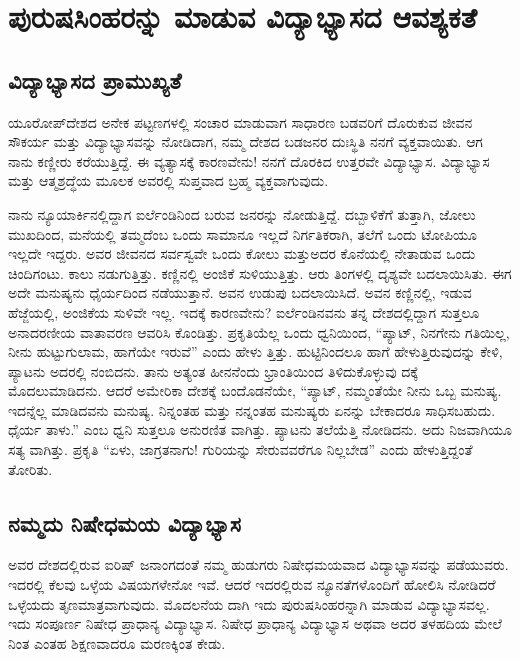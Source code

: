 
\chapter{ಪುರುಷಸಿಂಹರನ್ನು ಮಾಡುವ ವಿದ್ಯಾಭ್ಯಾಸದ ಆವಶ್ಯಕತೆ}

\section{ವಿದ್ಯಾಭ್ಯಾಸದ ಪ್ರಾಮುಖ್ಯತೆ}

ಯೂರೋಪ್​ದೇಶದ ಅನೇಕ ಪಟ್ಟಣಗಳಲ್ಲಿ ಸಂಚಾರ ಮಾಡುವಾಗ ಸಾಧಾರಣ ಬಡವರಿಗೆ ದೊರುಕುವ ಜೀವನ ಸೌಕರ್ಯ ಮತ್ತು ವಿದ್ಯಾಭ್ಯಾಸವನ್ನು ನೋಡಿದಾಗ, ನಮ್ಮ ದೇಶದ ಬಡಜನರ ದುಃಸ್ಥಿತಿ ನನಗೆ ವ್ಯಕ್ತವಾಯಿತು. ಆಗ ನಾನು ಕಣ್ಣೀರು ಕರೆಯುತ್ತಿದ್ದೆ. ಈ ವ್ಯತ್ಯಾಸಕ್ಕೆ ಕಾರಣವೇನು! ನನಗೆ ದೊರಕಿದ ಉತ್ತರವೇ ವಿದ್ಯಾಭ್ಯಾಸ. ವಿದ್ಯಾಭ್ಯಾಸ ಮತ್ತು ಆತ್ಮಶ್ರದ್ಧೆಯ ಮೂಲಕ ಅವರಲ್ಲಿ ಸುಪ್ತವಾದ ಬ್ರಹ್ಮ ವ್ಯಕ್ತವಾಗುವುದು.

ನಾನು ನ್ಯೂಯಾರ್ಕಿನಲ್ಲಿದ್ದಾಗ ಐರ್ಲೆಂಡಿನಿಂದ ಬರುವ ಜನರನ್ನು ನೋಡುತ್ತಿದ್ದೆ. ದಬ್ಬಾಳಿಕೆಗೆ ತುತ್ತಾಗಿ, ಜೋಲು ಮುಖದಿಂದ, ಮನೆಯಲ್ಲಿ ತಮ್ಮದೆಂಬ ಒಂದು ಸಾಮಾನೂ ಇಲ್ಲದೆ ನಿರ್ಗತಿಕರಾಗಿ, ತಲೆಗೆ ಒಂದು ಟೋಪಿಯೂ ಇಲ್ಲದೇ ಇದ್ದರು. ಅವರ ಜೀವನದ ಸರ್ವಸ್ವವೇ ಒಂದು ಕೋಲು ಮತ್ತುಅದರ ಕೊನೆಯಲ್ಲಿ ನೇತಾಡುವ ಒಂದು ಚಿಂದಿಗಂಟು. ಕಾಲು ನಡುಗುತ್ತಿತ್ತು. ಕಣ್ಣಿನಲ್ಲಿ ಅಂಜಿಕೆ ಸುಳಿಯುತ್ತಿತ್ತು. ಆರು ತಿಂಗಳಲ್ಲಿ ದೃಶ್ಯವೇ ಬದಲಾಯಿಸಿತು. ಈಗ ಅದೇ ಮನುಷ್ಯನು ಧೈರ್ಯದಿಂದ ನಡೆಯುತ್ತಾನೆ. ಅವನ ಉಡುಪು ಬದಲಾಯಿಸಿದೆ. ಅವನ ಕಣ್ಣಿನಲ್ಲಿ, ಇಡುವ ಹೆಜ್ಜೆಯಲ್ಲಿ, ಅಂಜಿಕೆಯ ಸುಳಿವೇ ಇಲ್ಲ. ಇದಕ್ಕೆ ಕಾರಣವೇನು? ಐರ್ಲೆಂಡಿನವನು ತನ್ನ ದೇಶದಲ್ಲಿದ್ದಾಗ ಸುತ್ತಲೂ ಅನಾದರಣೀಯ ವಾತಾವರಣ ಆವರಿಸಿ ಕೊಂಡಿತ್ತು. ಪ್ರಕೃತಿಯೆಲ್ಲ ಒಂದು ಧ್ವನಿಯಿಂದ, “ಪ್ಯಾಟ್, ನಿನಗೇನು ಗತಿಯಿಲ್ಲ, ನೀನು ಹುಟ್ಟುಗುಲಾಮ, ಹಾಗೆಯೇ ಇರುವೆ” ಎಂದು ಹೇಳು ತ್ತಿತ್ತು. ಹುಟ್ಟಿನಿಂದಲೂ ಹಾಗೆ ಹೇಳುತ್ತಿರುವುದನ್ನು ಕೇಳಿ, ಪ್ಯಾಟನು ಅದರಲ್ಲಿ ನಂಬಿದನು. ತಾನು ಅತ್ಯಂತ ಹೀನನೆಂದು ಭ್ರಾಂತಿಯಿಂದ ತಿಳಿದುಕೊಳ್ಳುವು ದಕ್ಕೆ ಮೊದಲುಮಾಡಿದನು. ಆದರೆ ಅಮೇರಿಕಾ ದೇಶಕ್ಕೆ ಬಂದೊಡನೆಯೇ, “ಪ್ಯಾಟ್, ನಮ್ಮಂತೆಯೇ ನೀನು ಒಬ್ಬ ಮನುಷ್ಯ. ಇದನ್ನೆಲ್ಲ ಮಾಡಿದವನು ಮನುಷ್ಯ. ನಿನ್ನಂತಹ ಮತ್ತು ನನ್ನಂತಹ ಮನುಷ್ಯರು ಏನನ್ನು ಬೇಕಾದರೂ ಸಾಧಿಸಬಹುದು. ಧೈರ್ಯ ತಾಳು.” ಎಂಬ ಧ್ವನಿ ಸುತ್ತಲೂ ಅನುರಣಿತ ವಾಗಿತ್ತು. ಪ್ಯಾಟನು ತಲೆಯೆತ್ತಿ ನೋಡಿದನು. ಅದು ನಿಜವಾಗಿಯೂ ಸತ್ಯ ವಾಗಿತ್ತು. ಪ್ರಕೃತಿ “ಏಳು, ಜಾಗ್ರತನಾಗು! ಗುರಿಯನ್ನು ಸೇರುವವರೆಗೂ ನಿಲ್ಲಬೇಡ” ಎಂದು ಹೇಳುತ್ತಿದ್ದಂತೆ ತೋರಿತು.


\section{ನಮ್ಮದು ನಿಷೇಧಮಯ ವಿದ್ಯಾಭ್ಯಾಸ}

ಅವರ ದೇಶದಲ್ಲಿರುವ ಐರಿಷ್ ಜನಾಂಗದಂತೆ ನಮ್ಮ ಹುಡುಗರು ನಿಷೇಧಮಯವಾದ ವಿದ್ಯಾಭ್ಯಾಸವನ್ನು ಪಡೆಯುವರು. ಇದರಲ್ಲಿ ಕೆಲವು ಒಳ್ಳೆಯ ವಿಷಯಗಳೇನೋ ಇವೆ. ಆದರೆ ಇದರಲ್ಲಿರುವ ನ್ಯೂನತೆಗಳೊಂದಿಗೆ ಹೋಲಿಸಿ ನೋಡಿದರೆ ಒಳ್ಳೆಯದು ತೃಣಮಾತ್ರವಾಗುವುದು. ಮೊದಲನೆಯ ದಾಗಿ ಇದು ಪುರುಷಸಿಂಹರನ್ನಾಗಿ ಮಾಡುವ ವಿದ್ಯಾಭ್ಯಾಸವಲ್ಲ. ಇದು ಸಂಪೂರ್ಣ ನಿಷೇಧ ಪ್ರಾಧಾನ್ಯ ವಿದ್ಯಾಭ್ಯಾಸ. ನಿಷೇಧ ಪ್ರಾಧಾನ್ಯ ವಿದ್ಯಾಭ್ಯಾಸ ಅಥವಾ ಅದರ ತಳಹದಿಯ ಮೇಲೆ ನಿಂತ ಎಂತಹ ಶಿಕ್ಷಣವಾದರೂ ಮರಣಕ್ಕಿಂತ ಕೇಡು.

